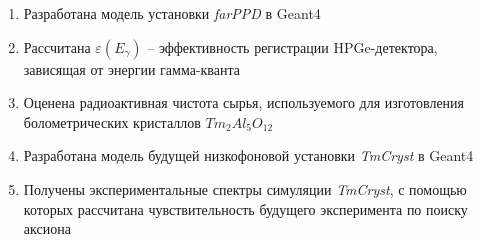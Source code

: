 \documentclass[a4paper,article,14pt]{extarticle}
\begin{document}
\begin{enumerate}
    \item Разработана модель установки \textit{farPPD} в Geant4
    \item Рассчитана $\varepsilon \left( E_{\gamma} \right)$ -- эффективность регистрации HPGe-детектора, зависящая от энергии гамма-кванта
    \item Оценена радиоактивная чистота сырья, используемого для изготовления болометрических кристаллов $Tm_2Al_5O_{12}$
    \item Разработана модель будущей низкофоновой установки \textit{TmCryst} в Geant4
    \item Получены экспериментальные спектры симуляции \textit{TmCryst}, с помощью которых рассчитана чувствительность будущего эксперимента по поиску аксиона
    \end{enumerate}

\medskip

\printbibliography[title={Литература}]{}
\end{document}
